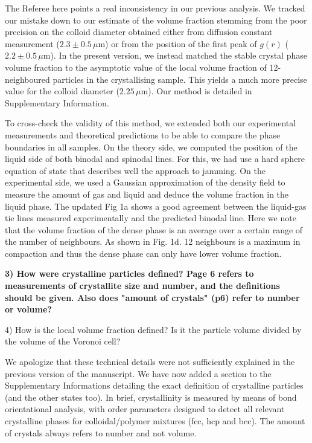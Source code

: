 \documentclass[11pt,a4paper]{article}
\newenvironment{referee}%
{\bigskip\singlespacing\bf}%
{\par\bigskip}
\begin{document}
The Referee here points a real inconsistency in our previous analysis. We tracked our mistake down to our estimate of the volume fraction stemming from the poor precision on the colloid diameter obtained either from diffusion constant measurement ($2.3\pm0.5\,\mu$m) or from the position of the first peak of $g(r)$ ($2.2\pm0.5\,\mu$m). In the present version, we instead matched the stable crystal phase volume fraction to the asymptotic value of the local volume fraction of 12-neighboured particles in the crystallising sample. This yields a much more precise value for the colloid diameter ($2.25\,\mu$m). Our method is detailed in Supplementary Information.

To cross-check the validity of this method, we extended both our experimental measurements and theoretical predictions to be able to compare the phase boundaries in all samples. On the theory side, we computed the position of the liquid side of both binodal and spinodal lines. For this, we had use a hard sphere equation of state that describes well the approach to jamming. On the experimental side, we used a Gaussian approximation of the density field to measure the amount of gas and liquid and deduce the volume fraction in the liquid phase. The updated Fig 1a shows a good agreement between the liquid-gas tie lines measured experimentally and the predicted binodal line. Here we note that the volume fraction of the dense phase is an average over a certain range of the number of neighbours. As shown in Fig. 1d. 12 neighbours is a maximum in compaction and thus the dense phase can only have lower volume fraction.

\begin{referee}
3) How were crystalline particles defined? Page 6 refers to measurements of crystallite size and number, and the definitions should be given. Also does "amount of crystals" (p6) refer to number or volume?

4) How is the local volume fraction defined? Is it the particle volume divided by the volume of the Voronoi cell?
\end{referee}

We apologize that these technical details were not sufficiently explained in the previous version of the manuscript.
We have now added a section to the Supplementary Informations detailing the exact definition of crystalline particles
(and the other states too). In brief, crystallinity is measured by means of bond orientational analysis, with order
parameters designed to detect all relevant crystalline phases for colloidal/polymer mixtures (fcc, hcp and bcc).
The amount of crystals always refers to number and not volume.
\end{document}
